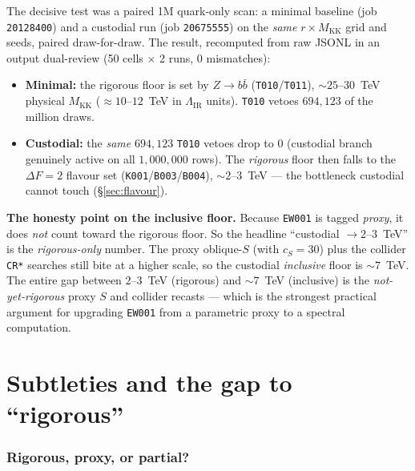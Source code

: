 \documentclass[11pt]{article}
\newcommand{\MKK}{M_{\mathrm{KK}}}
\newcommand{\LIR}{\Lambda_{\mathrm{IR}}}
\newcommand{\code}[1]{\texttt{#1}}
\theoremstyle{definition}
\begin{document}
The decisive test was a paired 1M quark-only scan: a minimal baseline (job
\code{20128400}) and a custodial run (job \code{20675555}) on the \emph{same}
$r\times\MKK$ grid and seeds, paired draw-for-draw. The result, recomputed from
raw JSONL in an output dual-review (50 cells $\times$ 2 runs, 0 mismatches):
\begin{itemize}[leftmargin=1.4em]
\item \textbf{Minimal:} the rigorous floor is set by $Z\to b\bar b$
(\code{T010}/\code{T011}), $\sim 25$--$30$~TeV physical $\MKK$
($\approx 10$--$12$~TeV in $\LIR$ units). \code{T010} vetoes
$694{,}123$ of the million draws.
\item \textbf{Custodial:} the \emph{same} $694{,}123$ \code{T010} vetoes drop to
\textbf{$0$} (custodial branch genuinely active on all $1{,}000{,}000$ rows). The
\emph{rigorous} floor then falls to the $\Delta F=2$ flavour set
(\code{K001}/\code{B003}/\code{B004}), $\sim 2$--$3$~TeV --- the bottleneck
custodial cannot touch (\S\ref{sec:flavour}).
\end{itemize}
\textbf{The honesty point on the inclusive floor.} Because \code{EW001} is tagged
\emph{proxy}, it does \emph{not} count toward the rigorous floor. So the headline
``custodial $\to 2$--$3$~TeV'' is the \emph{rigorous-only} number. The proxy
oblique-$S$ (with $c_S=30$) plus the collider \code{CR*} searches still bite at a
higher scale, so the custodial \emph{inclusive} floor is $\sim 7$~TeV. The entire
gap between $2$--$3$~TeV (rigorous) and $\sim 7$~TeV (inclusive) is the
\emph{not-yet-rigorous} proxy $S$ and collider recasts --- which is the strongest
practical argument for upgrading \code{EW001} from a parametric proxy to a
spectral computation.

\part{Subtleties and the gap to ``rigorous''}
\label{part:subtle}

\section{Rigorous, proxy, or partial?}
\label{sec:tags}
\end{document}
